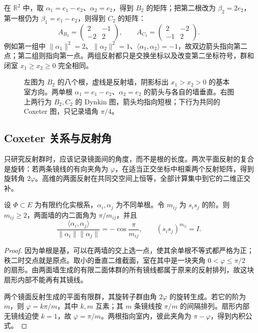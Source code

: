 \begin{example}\label{g1:eg:bc-cartan-matrices}
	在 \(\mathbb R^2\) 中，取 \(\alpha_1=e_1-e_2\)、\(\alpha_2=e_2\)，得到 \(B_2\) 的矩阵；把第二根改为 \(\beta_2=2e_2\)，第一根仍为 \(\beta_1=e_1-e_2\)，则得到 \(C_2\) 的矩阵：
	\[
		A_{B_2}=\begin{pmatrix}2&-1\\-2&2\end{pmatrix},\qquad
		A_{C_2}=\begin{pmatrix}2&-2\\-1&2\end{pmatrix}.
	\]
	例如第一组中 \(\lVert\alpha_1\rVert^2=2\)、\(\lVert\alpha_2\rVert^2=1\)、\(\langle\alpha_1,\alpha_2\rangle=-1\)，故双边箭头指向第二点；第二组则指向第一点。两组反射都只是交换坐标以及改变第二坐标符号，群和闭室 \(x_1\ge x_2\ge0\) 完全相同。
\end{example}

\begin{figure}[htbp]
	\centering
	
	\caption[根、反射墙与两类图]{左图为 \(B_2\) 的八个根，虚线是反射墙，阴影标出 \(x_1>x_2>0\) 的基本室方向。两单根 \(\alpha_1=e_1-e_2\)、\(\alpha_2=e_2\) 的箭头与各自的墙垂直。右图上两行为 \(B_2,C_2\) 的 Dynkin 图，箭头均指向短根；下行为共同的 Coxeter 图，只记录墙角 \(\pi/4\)。}
	\label{g1:fig:root-walls-diagrams}
\end{figure}

\subsection{Coxeter 关系与反射角}
\label{g1:subsec:E02:03}

只研究反射群时，应该记录镜面间的角度，而不是根的长度。两次平面反射的复合是旋转：若两条镜线的有向夹角为 \(\varphi\)，在适当正交坐标中相乘两个反射矩阵，得到旋转角 \(2\varphi\)。高维的两面反射在共同交空间上恒等，全部计算集中到它的二维正交补。

\begin{proposition}\label{g1:prop:simple-reflection-angle}
	设 \(\Phi\subset E\) 为有限约化实根系，\(\alpha_i,\alpha_j\) 为不同单根。令 \(m_{ij}\) 为 \(s_is_j\) 的阶。则 \(m_{ij}\ge2\)，两面墙的内二面角为 \(\pi/m_{ij}\)，并且
	\begin{equation}\label{g1:eq:reflection-angle-product}
		\frac{\langle\alpha_i,\alpha_j\rangle}{\lVert\alpha_i\rVert\lVert\alpha_j\rVert}
		=-\cos\frac\pi{m_{ij}},\qquad
		(s_is_j)^{m_{ij}}=I.
	\end{equation}
\end{proposition}
\begin{proof}
	因为单根是基，可以在两墙的交上选一点，使其余单根不等式都严格为正；秩二时交点就是原点。取小的垂直二维截面，室在其中是一块夹角 \(0<\varphi\le\pi/2\) 的扇形。由两面墙生成的有限二面体群的所有镜线都属于原来的反射排列，故这块扇形内部不能再有其镜线。

	两个镜面反射生成的平面有限群，其旋转子群由角 \(2\varphi\) 的旋转生成。若它的阶为 \(m\)，则 \(\varphi=k\pi/m\)，其中 \(k,m\) 互素；其 \(m\) 条镜线按 \(\pi/m\) 的间隔排列。扇形内部无镜线迫使 \(k=1\)，故 \(\varphi=\pi/m\)。两根指向室内，彼此夹角为 \(\pi-\varphi\)，得到内积公式。
\end{proof}

